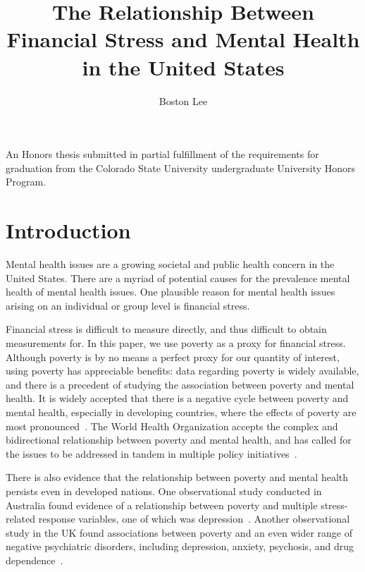 \documentclass{article}
\title{The Relationship Between Financial Stress and Mental Health in the United States}
\author{Boston Lee}
\begin{document}
\maketitle

\vfill
\begin{center}
\begin{minipage}{30em}
\begin{center}
An Honors thesis submitted in partial fulfillment of the requirements for
graduation from the Colorado State University undergraduate University Honors
Program.
\end{center}
\end{minipage}
\end{center}
\vfill

\pagebreak

\tableofcontents

\pagebreak

\section{Introduction}

Mental health issues are a growing societal and public health concern
in the United States.
There are a myriad of potential causes for the prevalence mental health
of mental health issues.
One plausible reason for mental health issues arising
on an individual or group level
is financial stress.

Financial stress is difficult to measure directly,
and thus difficult to obtain measurements for.
In this paper, we use poverty as a proxy for financial stress.
Although poverty is by no means a perfect proxy
for our quantity of interest,
using poverty has appreciable benefits:
data regarding poverty is widely available,
and there is a precedent of studying
the association between poverty and mental health.
It is widely accepted that there is a
negative cycle between poverty and mental health,
especially in developing countries,
where the effects of poverty are most pronounced~\cite{lund_2011}.
The World Health Organization accepts
the complex and bidirectional
relationship between poverty and mental health,
and has called for the issues to be addressed
in tandem in multiple policy initiatives~\cite{who_2003, who_2010}.

There is also evidence that the relationship
between poverty and mental health persists
even in developed nations.
One observational study conducted in Australia
found evidence of a relationship between
poverty and multiple stress-related response variables,
one of which was depression~\cite{saunders_1998}.
Another observational study in the UK found associations
between poverty and an even wider range of negative
psychiatric disorders, including depression,
anxiety, psychosis, and drug dependence~\cite{murali_oyebode_2004}.
\end{document}
